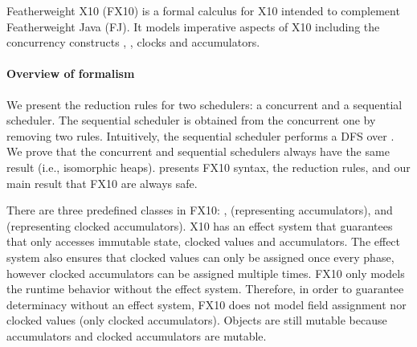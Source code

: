 Featherweight X10 (FX10) is a formal calculus for X10 intended to  complement Featherweight Java
(FJ).  It models imperative aspects of X10 including the concurrency
constructs \hfinish{}, \hasync{}, clocks and accumulators.

\paragraph{Overview of formalism}
We present the reduction rules for two schedulers:
    a concurrent and a sequential scheduler.
The sequential scheduler is obtained from the concurrent one by removing two rules.
Intuitively, the sequential scheduler performs a DFS over .
We prove that the concurrent and sequential schedulers always have the same result (i.e., isomorphic heaps).
 presents FX10 syntax,
     the reduction rules,
    and  our main result that FX10 are always safe.

There are three predefined classes in FX10:
    ,
     (representing accumulators),
    and  (representing clocked accumulators).
X10 has an effect system that guarantees that
    \hasync{} only accesses immutable state, clocked values and accumulators.
The effect system also ensures that clocked values can only be assigned once every phase,
    however clocked accumulators can be assigned multiple times.
FX10 only models the runtime behavior without the effect system.
Therefore, in order to guarantee determinacy without an effect system,
    FX10 does not model field assignment nor clocked values (only clocked accumulators).
Objects are still mutable because accumulators and clocked accumulators
    are mutable.

